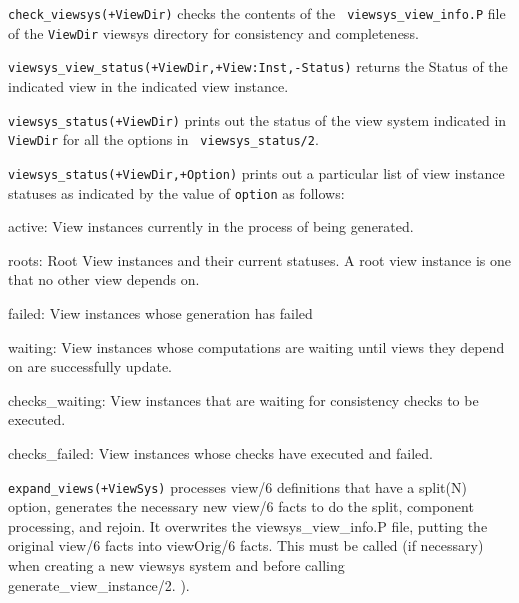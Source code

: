 \begin{description}
%
  {\tt check\_viewsys(+ViewDir)} checks the contents of the {\tt
    viewsys\_view\_info.P} file of the {\tt ViewDir} viewsys directory
  for consistency and completeness.

{\tt viewsys\_view\_status(+ViewDir,+View:Inst,-Status)} returns the
Status of the indicated view in the indicated view instance.

%
{\tt viewsys\_status(+ViewDir)} prints out the status of the view
system indicated in {\tt ViewDir} for all the options in {\tt
  viewsys\_status/2}.

%
  {\tt viewsys\_status(+ViewDir,+Option)} prints out a particular list
  of view instance statuses as indicated by the value of {\tt option}
  as follows:

\begin{description}

\item{active:} View instances currently in the process of being
generated.

\item{roots:} Root View instances and their current statuses.  A root
view instance is one that no other view depends on.

\item{failed:} View instances whose generation has failed

\item{waiting:} View instances whose computations are waiting until
views they depend on are successfully update.

\item{checks\_waiting:} View instances that are waiting for consistency
checks to be executed.

\item{checks\_failed:} View instances whose checks have executed and
failed.

\end{description}

{\tt expand\_views(+ViewSys)}
processes view/6 definitions that have a split(N) option, generates
the necessary new view/6 facts to do the split, component processing,
and rejoin.  It overwrites the viewsys\_view\_info.P file, putting the
original view/6 facts into viewOrig/6 facts.  This must be called (if
necessary) when creating a new viewsys system and before calling
generate\_view\_instance/2.  ).


\end{description}

